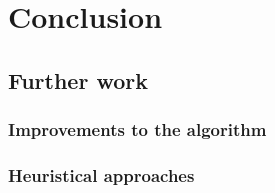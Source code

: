 \documentclass[thesis.tex]{subfiles}
\begin{document}
\chapter{Conclusion}
\section{Further work}
\subsection{Improvements to the algorithm}
\subsection{Heuristical approaches}
\end{document}
